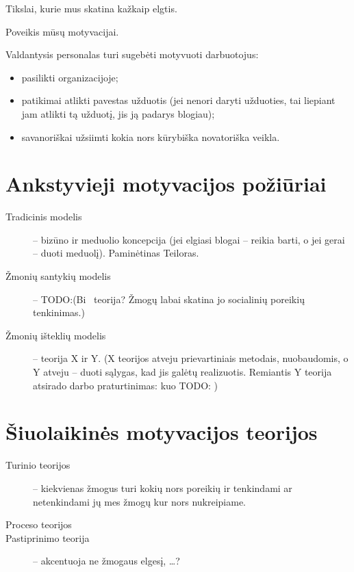 \begin{defn}[Motyvai]
  Tikslai, kurie mus skatina kažkaip elgtis.
\end{defn}

\begin{defn}[Motyvavimas]
  Poveikis mūsų motyvacijai.
\end{defn}

Valdantysis personalas turi sugebėti motyvuoti darbuotojus:
\begin{itemize}
  \item pasilikti organizacijoje;
  \item patikimai atlikti pavestas užduotis (jei nenori daryti užduoties,
    tai liepiant jam atlikti tą užduotį, jis ją padarys blogiau);
  \item savanoriškai užsiimti kokia nors kūrybiška novatoriška veikla.
\end{itemize}

\section{Ankstyvieji motyvacijos požiūriai}

\begin{description}
  \item[Tradicinis modelis] – bizūno ir meduolio koncepcija (jei elgiasi
    blogai – reikia barti, o jei gerai – duoti meduolį). Paminėtinas
    Teiloras.
  \item[Žmonių santykių modelis] – TODO:(Bi~ teorija? Žmogų labai skatina
    jo socialinių poreikių tenkinimas.)
  \item[Žmonių išteklių modelis] – teorija X ir Y. (X teorijos atveju
    prievartiniais metodais, nuobaudomis, o Y atveju – duoti sąlygas,
    kad jis galėtų realizuotis. Remiantis Y teorija atsirado darbo
    praturtinimas: kuo TODO: )
\end{description}

\section{Šiuolaikinės motyvacijos teorijos}

\begin{description}
  \item[Turinio teorijos] – kiekvienas žmogus turi kokių nors poreikių
    ir tenkindami ar netenkindami jų mes žmogų kur nors nukreipiame.
  \item[Proceso teorijos] 
  \item[Pastiprinimo teorija] – akcentuoja ne žmogaus elgesį, …?
\end{description}

